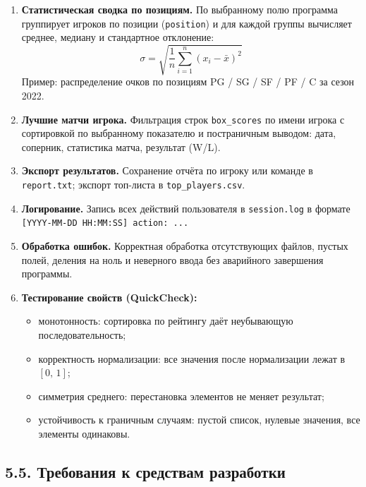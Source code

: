 \documentclass[a4paper, final]{article}
\begin{document}
\begin{enumerate}
    \item \textbf{Статистическая сводка по позициям.} По выбранному полю программа группирует игроков по позиции (\texttt{position}) и для каждой группы вычисляет среднее, медиану и стандартное отклонение:
    \[
        \sigma = \sqrt{\frac{1}{n}\sum_{i=1}^{n}(x_i - \bar{x})^2}
    \]
    Пример: распределение очков по позициям PG / SG / SF / PF / C за сезон 2022.

    \item \textbf{Лучшие матчи игрока.} Фильтрация строк \texttt{box\_scores} по имени игрока с сортировкой по выбранному показателю и постраничным выводом: дата, соперник, статистика матча, результат (W/L).

    \item \textbf{Экспорт результатов.} Сохранение отчёта по игроку или команде в \texttt{report.txt}; экспорт топ-листа в \texttt{top\_players.csv}.

    \item \textbf{Логирование.} Запись всех действий пользователя в \texttt{session.log} в формате \texttt{[YYYY-MM-DD HH:MM:SS] action: ...}

    \item \textbf{Обработка ошибок.} Корректная обработка отсутствующих файлов, пустых полей, деления на ноль и неверного ввода без аварийного завершения программы.

    \item \textbf{Тестирование свойств (QuickCheck):}
    \begin{itemize}
        \item монотонность: сортировка по рейтингу даёт неубывающую последовательность;
        \item корректность нормализации: все значения после нормализации лежат в $[0,\,1]$;
        \item симметрия среднего: перестановка элементов не меняет результат;
        \item устойчивость к граничным случаям: пустой список, нулевые значения, все элементы одинаковы.
    \end{itemize}

\end{enumerate}

\subsection*{5.5. Требования к средствам разработки}
\end{document}
